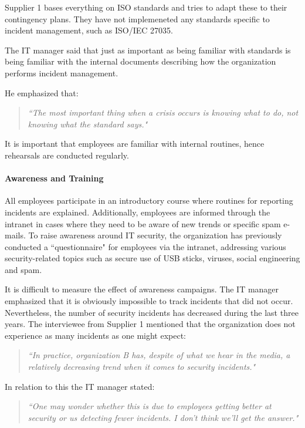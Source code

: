 Supplier 1 bases everything on \acs{ISO} standards and tries to adapt these to their contingency plans. They have not implemeneted any standards specific to incident management, such as \acs{ISO}/\acs{IEC} 27035. 

The IT manager said that just as important as being familiar with standards is being familiar with the internal documents describing how the organization performs incident management. 

He emphasized that:
\begin{quote}
\textit{``The most important thing when a crisis occurs is knowing what to do, not knowing what the standard says."}
\end{quote}
It is important that employees are familiar with internal routines, hence rehearsals are conducted regularly.

\paragraph{Awareness and Training}
All employees participate in an introductory course where routines for reporting incidents are explained. Additionally, employees are informed through the intranet in cases where they need to be aware of new trends or specific spam e-mails. To raise awareness around IT security, the organization has previously conducted a ``questionnaire" for employees via the intranet, addressing various security-related topics such as secure use of USB sticks, viruses, social engineering and spam. 

It is difficult to measure the effect of awareness campaigns. The IT manager emphasized that it is obviously impossible to track incidents that did not occur. Nevertheless, the number of security incidents has decreased during the last three years. The interviewee from Supplier 1 mentioned that the organization does not experience as many incidents as one might expect: 

\begin{quote}
\textit{``In practice, organization B has, despite of what we hear in the media, a relatively decreasing trend when it comes to security incidents."}
\end{quote} 

In relation to this the IT manager stated:

\begin{quote}
\textit{``One may wonder whether this is due to employees getting better at security or us detecting fewer incidents. I don't think we'll get the answer."}
\end{quote}
 
